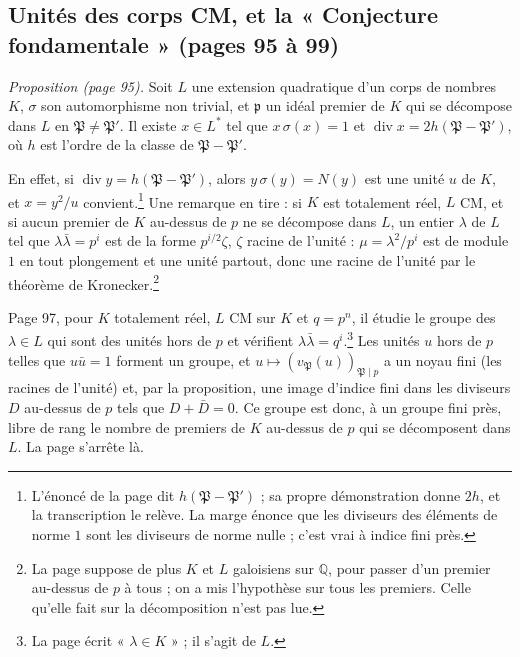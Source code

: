 \documentclass[11pt,a4paper]{article}
\begin{document}
\subsection*{Unités des corps CM, et la « Conjecture fondamentale » (pages 95 à 99)}

\emph{Proposition (page 95).} Soit $L$ une extension quadratique d'un corps de
nombres $K$, $\sigma$ son automorphisme non trivial, et $\mathfrak{p}$ un idéal
premier de $K$ qui se décompose dans $L$ en $\mathfrak{P} \neq \mathfrak{P}'$.
Il existe $x \in L^{*}$ tel que $x\,\sigma(x) = 1$ et $\operatorname{div} x =
2h(\mathfrak{P} - \mathfrak{P}')$, où $h$ est l'ordre de la classe de
$\mathfrak{P} - \mathfrak{P}'$.

En effet, si $\operatorname{div} y = h(\mathfrak{P} - \mathfrak{P}')$, alors
$y\,\sigma(y) = N(y)$ est une unité $u$ de $K$, et $x = y^{2}/u$
convient.\footnote{L'énoncé de la page dit $h(\mathfrak{P} - \mathfrak{P}')$ ;
sa propre démonstration donne $2h$, et la transcription le relève. La marge
énonce que les diviseurs des éléments de norme $1$ sont les diviseurs de norme
nulle ; c'est vrai à indice fini près.} Une remarque en tire : si $K$ est
totalement réel, $L$ CM, et si aucun premier de $K$ au-dessus de $p$ ne se
décompose dans $L$, un entier $\lambda$ de $L$ tel que $\lambda\bar{\lambda} =
p^{i}$ est de la forme $p^{i/2}\zeta$, $\zeta$ racine de l'unité : $\mu =
\lambda^{2}/p^{i}$ est de module $1$ en tout plongement et une unité partout,
donc une racine de l'unité par le théorème de Kronecker.\footnote{La page
suppose de plus $K$ et $L$ galoisiens sur $\mathbb{Q}$, pour passer d'un premier
au-dessus de $p$ à tous ; on a mis l'hypothèse sur tous les premiers. Celle
qu'elle fait sur la décomposition n'est pas lue.}

Page 97, pour $K$ totalement réel, $L$ CM sur $K$ et $q = p^{n}$, il étudie le
groupe des $\lambda \in L$ qui sont des unités hors de $p$ et vérifient
$\lambda\bar{\lambda} = q^{i}$.\footnote{La page écrit « $\lambda \in K$ » ; il
s'agit de $L$.} Les unités $u$ hors de $p$ telles que $u\bar{u} = 1$ forment un
groupe, et $u \mapsto (v_{\mathfrak{P}}(u))_{\mathfrak{P} \mid p}$ a un noyau
fini (les racines de l'unité) et, par la proposition, une image d'indice fini
dans les diviseurs $D$ au-dessus de $p$ tels que $D + \bar{D} = 0$. Ce groupe
est donc, à un groupe fini près, libre de rang le nombre de premiers de $K$
au-dessus de $p$ qui se décomposent dans $L$. La page s'arrête là.
\end{document}
